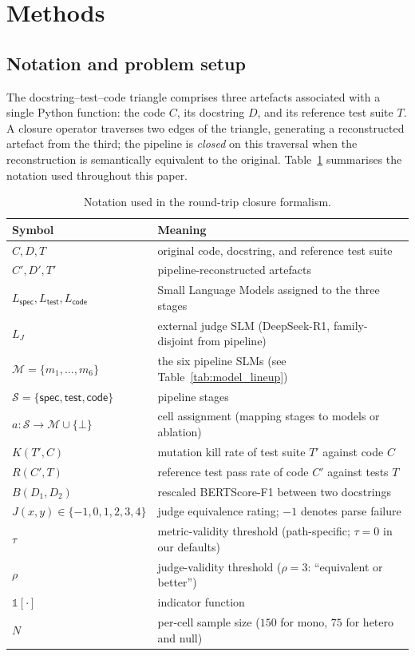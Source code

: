 \section{Methods}
\label{sec:methods}

\subsection{Notation and problem setup}

The docstring--test--code triangle comprises three artefacts associated with a single Python function: the code $C$, its docstring $D$, and its reference test suite $T$. A closure operator traverses two edges of the triangle, generating a reconstructed artefact from the third; the pipeline is \emph{closed} on this traversal when the reconstruction is semantically equivalent to the original. Table~\ref{tab:notation} summarises the notation used throughout this paper.

\begin{table}[h]
\centering
\small
\caption{Notation used in the round-trip closure formalism.}
\label{tab:notation}
\begin{tabular}{ll}
\toprule
Symbol & Meaning \\
\midrule
$C, D, T$ & original code, docstring, and reference test suite \\
$C', D', T'$ & pipeline-reconstructed artefacts \\
$L_{\textsf{spec}}, L_{\textsf{test}}, L_{\textsf{code}}$ & Small Language Models assigned to the three stages \\
$L_J$ & external judge SLM (DeepSeek-R1, family-disjoint from pipeline) \\
$\mathcal{M} = \{m_1, \ldots, m_6\}$ & the six pipeline SLMs (see Table~\ref{tab:model_lineup}) \\
$\mathcal{S} = \{\textsf{spec}, \textsf{test}, \textsf{code}\}$ & pipeline stages \\
$a : \mathcal{S} \to \mathcal{M} \cup \{\bot\}$ & cell assignment (mapping stages to models or ablation) \\
$K(T', C)$ & mutation kill rate of test suite $T'$ against code $C$ \\
$R(C', T)$ & reference test pass rate of code $C'$ against tests $T$ \\
$B(D_1, D_2)$ & rescaled BERTScore-F1 between two docstrings \\
$J(x, y) \in \{-1, 0, 1, 2, 3, 4\}$ & judge equivalence rating; $-1$ denotes parse failure \\
$\tau$ & metric-validity threshold (path-specific; $\tau = 0$ in our defaults) \\
$\rho$ & judge-validity threshold ($\rho = 3$: ``equivalent or better'') \\
$\mathds{1}[\cdot]$ & indicator function \\
$N$ & per-cell sample size ($150$ for mono, $75$ for hetero and null) \\
\bottomrule
\end{tabular}
\end{table}

